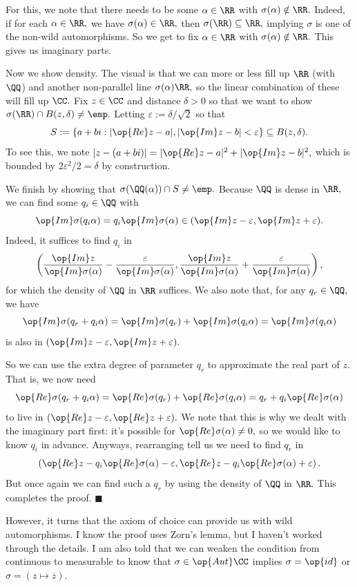 For this, we note that there needs to be some $\alpha\in\RR$ with $\sigma(\alpha)\notin\RR.$ Indeed, if for each $\alpha\in\RR,$ we have $\sigma(\alpha)\in\RR,$ then $\sigma(\RR)\subseteq\RR,$ implying $\sigma$ is one of the non-wild automorphisms. So we get to fix $\alpha\in\RR$ with $\sigma(\alpha)\notin\RR.$ This gives us imaginary parts.

Now we show density. The visual is that we can more or less fill up $\RR$ (with $\QQ$) and another non-parallel line $\sigma(\alpha)\RR,$ so the linear combination of these will fill up $\CC.$ Fix $z\in\CC$ and distance $\delta>0$ so that we want to show $\sigma(\RR)\cap B(z,\delta)\ne\emp.$ Letting $\varepsilon:=\delta/\sqrt2$ so that
\[S:=\{a+bi:|\op{Re}z-a|,|\op{Im}z-b|<\varepsilon\}\subseteq B(z,\delta).\]
To see this, we note $|z-(a+bi)|=|\op{Re}z-a|^2+|\op{Im}z-b|^2,$ which is bounded by $2\varepsilon^2/2=\delta$ by construction.

We finish by showing that $\sigma(\QQ(\alpha))\cap S\ne\emp.$ Because $\QQ$ is dense in $\RR,$ we can find some $q_i\in\QQ$ with
\[\op{Im}\sigma(q_i\alpha)=q_i\op{Im}\sigma(\alpha)\in(\op{Im}z-\varepsilon,\op{Im}z+\varepsilon).\]
Indeed, it suffices to find $q_i$ in
\[\left(\frac{\op{Im}z}{\op{Im}\sigma(\alpha)}-\frac\varepsilon{\op{Im}\sigma(\alpha)},\frac{\op{Im}z}{\op{Im}\sigma(\alpha)}+\frac\varepsilon{\op{Im}\sigma(\alpha)}\right),\]
for which the density of $\QQ$ in $\RR$ suffices. We also note that, for any $q_r\in\QQ,$ we have
\[\op{Im}\sigma(q_r+q_i\alpha)=\op{Im}\sigma(q_r)+\op{Im}\sigma(q_i\alpha)=\op{Im}\sigma(q_i\alpha)\]
is also in $(\op{Im}z-\varepsilon,\op{Im}z+\varepsilon).$

So we can use the extra degree of parameter $q_r$ to approximate the real part of $z.$ That is, we now need
\[\op{Re}\sigma(q_r+q_i\alpha)=\op{Re}\sigma(q_r)+\op{Re}\sigma(q_i\alpha)=q_r+q_i\op{Re}\sigma(\alpha)\]
to live in $(\op{Re}z-\varepsilon,\op{Re}z+\varepsilon).$ We note that this is why we dealt with the imaginary part first: it's possible for $\op{Re}\sigma(\alpha)\ne0,$ so we would like to know $q_i$ in advance. Anyways, rearranging tell us we need to find $q_r$ in
\[\left(\op{Re}z-q_i\op{Re}\sigma(\alpha)-\varepsilon,\op{Re}z-q_i\op{Re}\sigma(\alpha)+\varepsilon\right).\]
But once again we can find such a $q_r$ by using the density of $\QQ$ in $\RR.$ This completes the proof. $\blacksquare$

However, it turns that the axiom of choice can provide us with wild automorphisms. I know the proof uses Zorn's lemma, but I haven't worked through the details. I am also told that we can weaken the condition from continuous to measurable to know that $\sigma\in\op{Aut}\CC$ implies $\sigma=\op{id}$ or $\sigma=(z\mapsto\overline z).$


